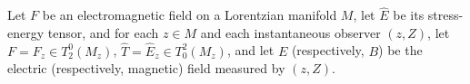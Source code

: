 Let $F$ be an electromagnetic field on a Lorentzian manifold $M$, let $\hat{E}$ be its stress-energy tensor, and for each $z \in M$ and each instantaneous observer $(z, Z)$, let $F = F_z \in T_2^0(M_z)$, $\hat{T} = \hat{E}_z \in T_0^2(M_z)$, and let $E$ (respectively, $B$) be the electric (respectively, magnetic) field measured by $(z, Z)$.
